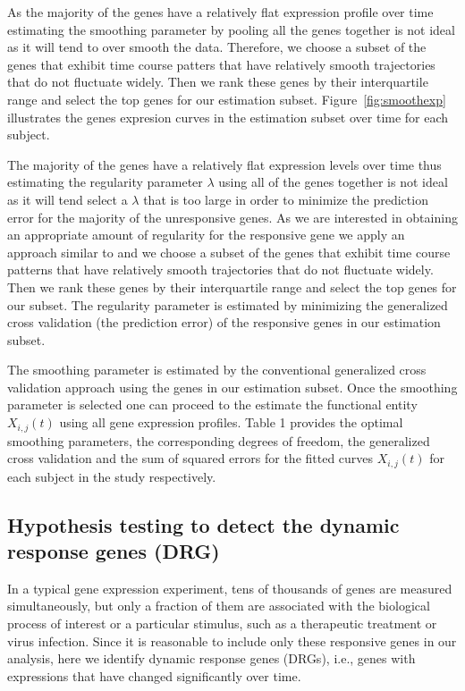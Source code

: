 As the majority of the genes have a relatively flat expression profile over time estimating the smoothing parameter by pooling all the genes together is not ideal as it will tend to over smooth the data. Therefore, we choose a subset of the genes that exhibit time course patters that have relatively smooth trajectories that do not fluctuate widely. Then we rank these genes by their interquartile range and select the top genes for our estimation subset. Figure~\ref{fig:smoothexp} illustrates the genes expresion curves in the estimation subset over time for each subject. 

The majority of the genes have a relatively flat expression levels over time thus estimating the regularity parameter $\lambda$ using all of the genes together is not ideal as it will tend select a $\lambda$ that is too large in order to minimize the prediction error for the majority of the unresponsive genes. As we are interested in obtaining an appropriate amount of regularity for the responsive gene we apply an approach similar to \cite{yao2005functional} and \cite{wu2013more} we choose a subset of the genes that exhibit time course patterns that have relatively smooth trajectories that do not fluctuate widely. Then we rank these genes by their interquartile range and select the top genes for our subset. The regularity parameter is estimated by minimizing the generalized cross validation (the prediction error) of the responsive genes in our estimation subset.

The smoothing parameter is estimated by the conventional generalized cross validation approach using the genes in our estimation subset. Once the smoothing parameter is selected one can proceed to the estimate the functional entity $X_{i,j}(t)$ using all gene expression profiles. Table 1 provides the optimal smoothing parameters, the corresponding degrees of freedom, the generalized cross validation and the sum of squared errors for the fitted curves $X_{i,j}(t)$ for each subject in the study respectively.



\subsection*{Hypothesis testing to detect the dynamic response genes (DRG)}

In a typical gene expression experiment, tens of thousands of genes are measured simultaneously, but only a fraction of them are associated with the biological process of interest or a particular stimulus, such as a therapeutic treatment or virus infection. Since it is reasonable to include only these responsive genes in our analysis, here we identify dynamic response genes (DRGs), i.e., genes with expressions that have changed significantly over time.

